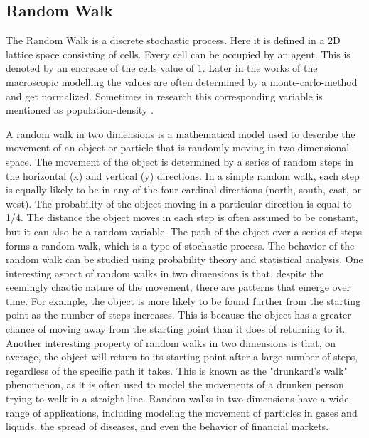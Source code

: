 \subsection{Random Walk}
The Random Walk is a discrete stochastic process. Here it is defined in a 2D lattice space consisting of cells. Every cell can be occupied by an agent. 
This is denoted by an encrease of the cells value of 1. 
Later in the works of the macroscopic modelling the values are often determined by a monte-carlo-method and get normalized. 
Sometimes in research this corresponding variable is mentioned as population-density \cite{Michi}.

A random walk in two dimensions is a mathematical model used to describe the movement of an object or particle that is randomly moving in two-dimensional space. 
The movement of the object is determined by a series of random steps in the horizontal (x) and vertical (y) directions.
In a simple random walk, each step is equally likely to be in any of the four cardinal directions (north, south, east, or west). 
The probability of the object moving in a particular direction is equal to 1/4. The distance the object moves in each step is often assumed to be constant, 
but it can also be a random variable.
The path of the object over a series of steps forms a random walk, which is a type of stochastic process. The behavior of the random walk 
can be studied using probability theory and statistical analysis.
One interesting aspect of random walks in two dimensions is that, despite the seemingly chaotic nature of the movement, there are patterns that emerge over time. 
For example, the object is more likely to be found further from the starting point as the number of steps increases. 
This is because the object has a greater chance of moving away from the starting point than it does of returning to it.
Another interesting property of random walks in two dimensions is that, on average, the object will return to its starting point after a large number of steps, 
regardless of the specific path it takes. This is known as the "drunkard's walk" phenomenon, as it is often used to model the movements of a drunken person trying to walk in a straight line.
Random walks in two dimensions have a wide range of applications, including modeling the movement of particles in gases and liquids, 
the spread of diseases, and even the behavior of financial markets.

